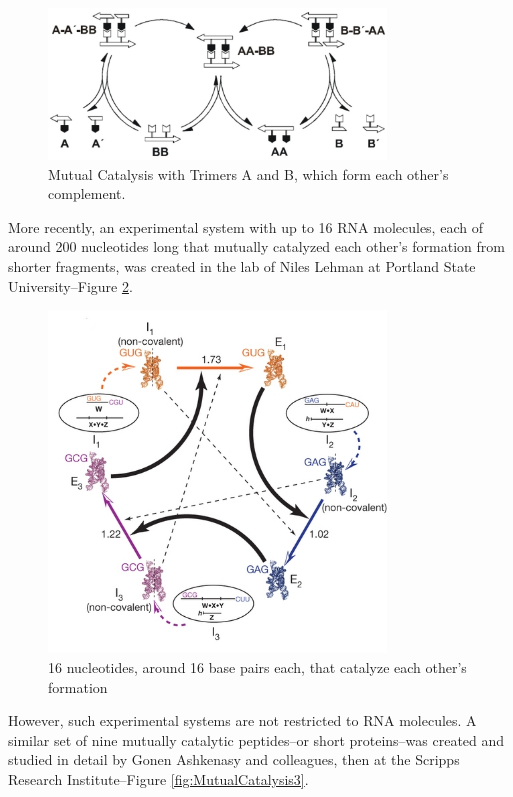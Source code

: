 \documentclass[]{article}
\begin{document}
\begin{figure}[H]
	\caption[Mutual Catalysis with Trimers A and B]{Mutual Catalysis with Trimers A and B, which form each other's complement\cite{patzke2007self}.}\label{fig:MutualCatalysis1}
	\includegraphics[width=0.8\textwidth]{MutualCatalysis1}
\end{figure}

More recently, an experimental system
with up to 16 RNA molecules,
each of around 200 nucleotides long
that mutually catalyzed each other's
formation from shorter fragments,
was created in the lab of Niles Lehman
at Portland State University--Figure \ref{fig:MutualCatalysis2}.

\begin{figure}[H]
	\caption[16 nucleotides that catalyze each other's formation]{16 nucleotides, around 16 base pairs each, that catalyze each other's formation}\label{fig:MutualCatalysis2}
	\includegraphics[width=0.8\textwidth]{MutualCatalysis2}
\end{figure}

However, such experimental systems are not restricted to RNA molecules.
A similar set of nine mutually catalytic peptides--or short proteins--was created and studied in detail by Gonen Ashkenasy and colleagues, then at the Scripps Research Institute--Figure \ref{fig:MutualCatalysis3}.
\end{document}
